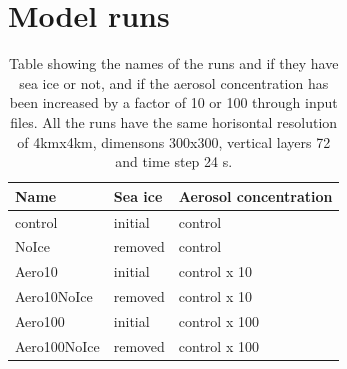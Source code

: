 \section{Model runs}
%
\begin{table}[H]
\centering
\caption{Table showing the names of the runs and if they have sea ice or not, and if the aerosol concentration has been increased by a factor of 10 or 100 through input files. All the runs have the same horisontal resolution of 4kmx4km, dimensons 300x300, vertical layers 72 and time step 24 s.}
\label{tab:runs} 
\begin{tabular}{L{2.3cm} L{2cm} L{3cm}}
\centering
Name & Sea ice & Aerosol concentration\\ \hline
control & initial & control\\
NoIce & removed & control\\
Aero10 & initial & control x 10\\
Aero10NoIce & removed & control x 10\\
Aero100 & initial & control x 100\\
Aero100NoIce & removed & control x 100\\
\end{tabular}
\end{table}

